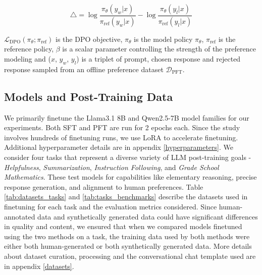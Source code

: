 \begin{equation*}
    \triangle = \log \frac{\pi_{\theta}(y_w | x)}{\pi_{\text{ref}}(y_w | x)}
    - \log \frac{\pi_{\theta}(y_l | x)}{\pi_{\text{ref}}(y_l | x)}
\end{equation*}

$\mathcal{L}_{\text{DPO}}(\pi_{\theta}; \pi_{\text{ref}})$ is the DPO objective, $\pi_\theta$ is the model policy $\pi_\theta$, $\pi_{\text{ref}}$ is the reference policy, $\beta$ is a scalar parameter controlling the strength of the preference modeling and ($x$, $y_w$, $y_l$) is a triplet of prompt, chosen response and rejected response sampled from an offline preference dataset $\mathcal{D}_{\text{PFT}}$.

\subsection{Models and Post-Training Data}

\label{exp_setup}


We primarily finetune the Llama3.1 8B and Qwen2.5-7B model families for our experiments. Both SFT and PFT are run for 2 epochs each. Since the study involves hundreds of finetuning runs, we use LoRA \cite{hu2021lora} to accelerate finetuning. Additional hyperparameter details are in appendix \ref{hyperparameters}.  
We consider four tasks that represent a diverse variety of LLM post-training goals - \textit{Helpfulness}, \textit{Summarization}, \textit{Instruction Following}, and \textit{Grade School Mathematics}. These test models for capabilities like elementary reasoning, precise response generation, and alignment to human preferences. Table \ref{tab:datasets_tasks} and \ref{tab:tasks_benchmarks} describe the datasets used in finetuning for each task and the evaluation metrics considered. Since human-annotated data and synthetically generated data could have significant differences in quality and content, we ensured that when we compared models finetuned using the two methods on a task, the training data used by both methods were either both human-generated or both synthetically generated data. More details about dataset curation, processing and the conversational chat template used are in appendix \ref{datasets}. 



